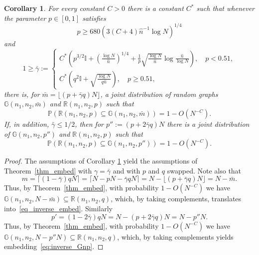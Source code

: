 \documentclass[12pt,reqno]{amsart}
\newcommand{\Prob} {\mathbb {P}}
\newcommand{\prob}[1]{\Prob\left(#1\right)}
\newcommand{\R} {\mathbb R}
\newcommand{\Rnnp}{\R(n_1,n_2,p)}
\newcommand{\G} {\mathbb G}
\newcommand{\I} {\mathbb I}
\newtheorem{corollary}[theorem]{Corollary}
\theoremstyle{definition}
\begin{document}
\begin{corollary}
  \label{cor_embed}
	For every  constant $C > 0$ there is a constant $C^*$ such that whenever the parameter $p \in [0,1]$ satisfies
    \begin{equation}
\label{eq:cor_embed_q}
      p \ge 680\left( 3(C + 4)\hat n^{-1}\log N\right)^{1/4}
    \end{equation}
 and
	\begin{equation*}
		1 \ge \bar\gamma:=
		\begin{cases}
			C^*\left( p^{3/2}\I +  \left(\frac{\log N}{\hat n} \right)^{1/4} + \frac 1p\sqrt{\frac{\log N}{\hat n}} \log \frac{\hat n}{\log N}\right), \quad  p < 0.51, \\
			C^*\left( q^2 \I + \sqrt{\frac{\log N}{q\hat n}}\right), \quad  p \ge 0.51,
		\end{cases}
	\end{equation*}
there is, for $\bar m=\lfloor(p+\bar\gamma q)N\rfloor$, a joint distribution of random graphs $\G(n_1,n_2,\bar m)$ and $\Rnnp$ such that
\begin{equation}
  \label{eq_inverse_embed}
	    \prob{\Rnnp \subseteq \G(n_1,n_2,\bar m)}=1 - O(N^{-C}).
    \end{equation}
    If, in addition, $\bar \gamma \le 1/2$, then  for $p'' := (p + 2\bar{\gamma} q)N$
	there is a joint distribution of $\G(n_1,n_2,p'')$ and $\Rnnp$ such that
\begin{equation}
\label{eq:inverse_Gnp}
  \prob{\Rnnp \subseteq \G(n_1,n_2,p'')} = 1 - O(N^{-C}).
    \end{equation}
\end{corollary}

\begin{proof}
	The assumptions of Corollary \ref{cor_embed} yield the assumptions of Theorem~\ref{thm_embed} with $\gamma=\bar\gamma$ and with $p$ and $q$ swapped. Note also that
	\[
	  m = \lceil(1-\bar\gamma)qN\rceil =\lceil N-pN-\bar\gamma q N\rceil= N - \lfloor(p+\bar\gamma q)N\rfloor=N-\bar m.
	\]
	Thus, by Theorem~\ref{thm_embed}, with probability $1 - O(N^{-C})$ we have $\G(n_1,n_2,N - \bar m) \subseteq \R(n_1,n_2,q)$, which, by taking complements, translates into~\eqref{eq_inverse_embed}. Similarly
	\[
	  p' = (1 - 2\bar \gamma)q N = N - (p + 2\bar \gamma q) N = N - p'' N.
	\]
	Thus, by Theorem~\ref{thm_embed}, with probability $1 - O(N^{-C})$ we have $\G(n_1,n_2,N-p''N) \subseteq \R(n_1,n_2,q)$, which, by taking complements yields embedding~\eqref{eq:inverse_Gnp}.
\end{proof}
\end{document}
